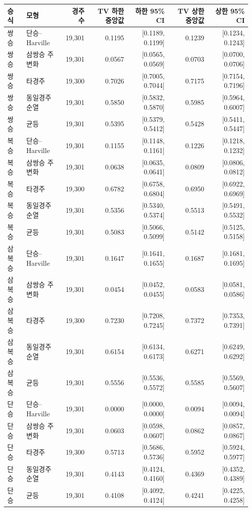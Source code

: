 \begin{tabular}{llrrrrr}
\toprule
승식 & 모형 & 경주 수 & TV 하한 중앙값 & 하한 95\% CI & TV 상한 중앙값 & 상한 95\% CI \\
\midrule
쌍승 & 단승--Harville & 19,301 & 0.1195 & [0.1189, 0.1199] & 0.1239 & [0.1234, 0.1243] \\
쌍승 & 삼쌍승 주변화 & 19,301 & 0.0567 & [0.0565, 0.0569] & 0.0703 & [0.0700, 0.0706] \\
쌍승 & 타경주 & 19,300 & 0.7026 & [0.7005, 0.7044] & 0.7175 & [0.7154, 0.7196] \\
쌍승 & 동일경주 순열 & 19,301 & 0.5850 & [0.5832, 0.5870] & 0.5985 & [0.5964, 0.6007] \\
쌍승 & 균등 & 19,301 & 0.5395 & [0.5379, 0.5412] & 0.5428 & [0.5411, 0.5447] \\
복승 & 단승--Harville & 19,301 & 0.1155 & [0.1148, 0.1161] & 0.1226 & [0.1218, 0.1232] \\
복승 & 삼쌍승 주변화 & 19,301 & 0.0638 & [0.0635, 0.0641] & 0.0809 & [0.0806, 0.0812] \\
복승 & 타경주 & 19,300 & 0.6782 & [0.6758, 0.6804] & 0.6950 & [0.6922, 0.6969] \\
복승 & 동일경주 순열 & 19,301 & 0.5356 & [0.5340, 0.5374] & 0.5513 & [0.5491, 0.5532] \\
복승 & 균등 & 19,301 & 0.5083 & [0.5066, 0.5099] & 0.5142 & [0.5125, 0.5158] \\
삼복승 & 단승--Harville & 19,301 & 0.1647 & [0.1641, 0.1655] & 0.1687 & [0.1681, 0.1695] \\
삼복승 & 삼쌍승 주변화 & 19,301 & 0.0454 & [0.0452, 0.0455] & 0.0583 & [0.0581, 0.0586] \\
삼복승 & 타경주 & 19,300 & 0.7230 & [0.7208, 0.7245] & 0.7372 & [0.7353, 0.7391] \\
삼복승 & 동일경주 순열 & 19,301 & 0.6154 & [0.6134, 0.6173] & 0.6271 & [0.6249, 0.6292] \\
삼복승 & 균등 & 19,301 & 0.5556 & [0.5536, 0.5572] & 0.5585 & [0.5569, 0.5607] \\
단승 & 단승--Harville & 19,301 & 0.0000 & [0.0000, 0.0000] & 0.0094 & [0.0094, 0.0094] \\
단승 & 삼쌍승 주변화 & 19,301 & 0.0603 & [0.0598, 0.0607] & 0.0862 & [0.0857, 0.0867] \\
단승 & 타경주 & 19,300 & 0.5713 & [0.5686, 0.5736] & 0.5952 & [0.5924, 0.5977] \\
단승 & 동일경주 순열 & 19,301 & 0.4143 & [0.4124, 0.4160] & 0.4369 & [0.4352, 0.4389] \\
단승 & 균등 & 19,301 & 0.4108 & [0.4092, 0.4124] & 0.4241 & [0.4225, 0.4258] \\
\bottomrule
\end{tabular}
